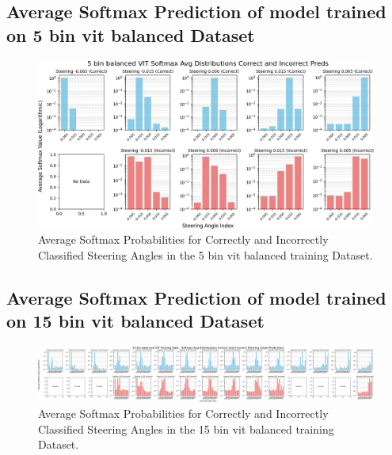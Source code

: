
\subsection{Average Softmax Prediction of model trained on 5 bin vit balanced Dataset}

\begin{figure}[H]
    \centering
    \includegraphics[width=1\linewidth]{Figures/Results/5_bins_vit_softmax_dist_plot_balanced.png}
    \caption{Average Softmax Probabilities for Correctly and Incorrectly Classified Steering Angles in the 5 bin vit balanced training Dataset.}
    \label{fig:5_bins_vit_softmax_dist_balanced}
\end{figure}


\subsection{Average Softmax Prediction of model trained on 15 bin vit balanced Dataset}

\begin{figure}[H]
    \centering
    \includegraphics[width=1\linewidth]{Figures/Results/15_bins_vit_softmax_dist_plot_balanced.png}
    \caption{Average Softmax Probabilities for Correctly and Incorrectly Classified Steering Angles in the 15 bin vit balanced training Dataset.}
    \label{fig:15_bins_vit_softmax_dist_balanced}
\end{figure}


